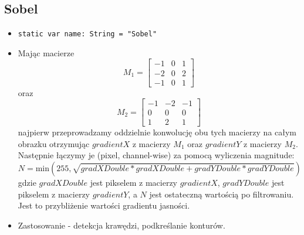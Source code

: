 \documentclass[a4paper]{article}
\begin{document}
\subsection{Sobel}

\begin{itemize}
    \item \texttt{static var name: String = "Sobel"}
    \item Mając macierze
          $$
              M_1 = \begin{bmatrix}
                  -1 & 0 & 1 \\
                  -2 & 0 & 2 \\
                  -1 & 0 & 1
              \end{bmatrix}
          $$
          oraz
          $$
              M_2 = \begin{bmatrix}
                  -1 & -2 & -1 \\
                  0  & 0  & 0  \\
                  1  & 2  & 1
              \end{bmatrix}
          $$
          najpierw przeprowadzamy oddzielnie konwolucję obu tych macierzy na całym obrazku otrzymując $gradientX$ z macierzy $M_1$ oraz $gradientY$ z macierzy $M_2$. Następnie łączymy je (pixel, channel-wise) za pomocą wyliczenia magnitude:
          $$
              N = \text{min}(255, \sqrt{gradXDouble * gradXDouble + gradYDouble * gradYDouble})
          $$
          gdzie $gradXDouble$ jest pikselem z macierzy $gradientX$, $gradYDouble$ jest pikselem z macierzy $gradientY$, a $N$ jest ostateczną wartością po filtrowaniu. Jest to przybliżenie wartości gradientu jasności.
    \item Zastosowanie - detekcja krawędzi, podkreślanie konturów.
\end{itemize}
\end{document}
